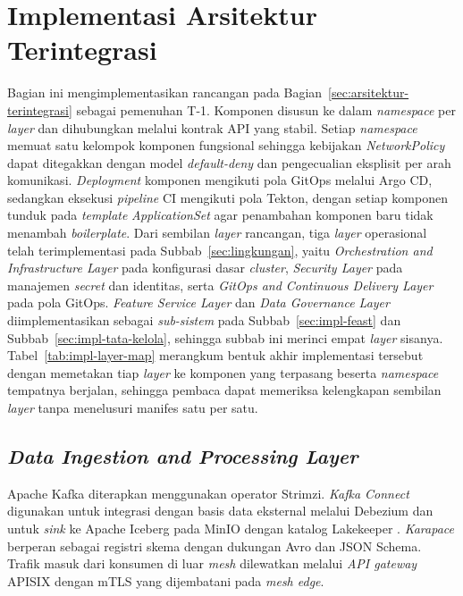 \section{Implementasi Arsitektur Terintegrasi}
\label{sec:impl-arsitektur}

Bagian ini mengimplementasikan rancangan pada Bagian~\ref{sec:arsitektur-terintegrasi} sebagai pemenuhan T-1. Komponen disusun ke dalam \textit{namespace} per \textit{layer} dan dihubungkan melalui kontrak API yang stabil. Setiap \textit{namespace} memuat satu kelompok komponen fungsional sehingga kebijakan \textit{NetworkPolicy} dapat ditegakkan dengan model \textit{default-deny} dan pengecualian eksplisit per arah komunikasi. \textit{Deployment} komponen mengikuti pola GitOps melalui Argo CD, sedangkan eksekusi \textit{pipeline} CI mengikuti pola Tekton, dengan setiap komponen tunduk pada \textit{template} \textit{ApplicationSet} agar penambahan komponen baru tidak menambah \textit{boilerplate}. Dari sembilan \textit{layer} rancangan, tiga \textit{layer} operasional telah terimplementasi pada Subbab~\ref{sec:lingkungan}, yaitu \textit{Orchestration and Infrastructure Layer} pada konfigurasi dasar \textit{cluster}, \textit{Security Layer} pada manajemen \textit{secret} dan identitas, serta \textit{GitOps and Continuous Delivery Layer} pada pola GitOps. \textit{Feature Service Layer} dan \textit{Data Governance Layer} diimplementasikan sebagai \textit{sub-sistem} pada Subbab~\ref{sec:impl-feast} dan Subbab~\ref{sec:impl-tata-kelola}, sehingga subbab ini merinci empat \textit{layer} sisanya. Tabel~\ref{tab:impl-layer-map} merangkum bentuk akhir implementasi tersebut dengan memetakan tiap \textit{layer} ke komponen yang terpasang beserta \textit{namespace} tempatnya berjalan, sehingga pembaca dapat memeriksa kelengkapan sembilan \textit{layer} tanpa menelusuri manifes satu per satu.



\subsection{\textit{Data Ingestion and Processing Layer}}
\label{subsec:impl-ingestasi}

Apache Kafka \autocite{apachekafka2024} diterapkan menggunakan operator Strimzi. \textit{Kafka Connect} digunakan untuk integrasi dengan basis data eksternal melalui Debezium dan untuk \textit{sink} ke Apache Iceberg pada MinIO \autocite{minio2024} dengan katalog Lakekeeper \autocite{lakekeeper2025}. \textit{Karapace} berperan sebagai registri skema dengan dukungan Avro dan JSON Schema. Trafik masuk dari konsumen di luar \textit{mesh} dilewatkan melalui \textit{API gateway} APISIX \autocite{apisix2025} dengan mTLS yang dijembatani pada \textit{mesh edge}.

